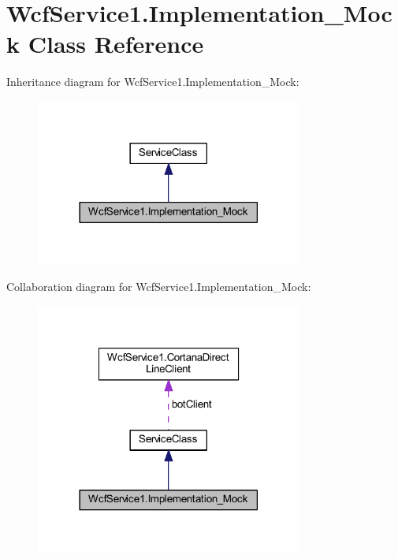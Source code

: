\hypertarget{class_wcf_service1_1_1_implementation___mock}{}\section{Wcf\+Service1.\+Implementation\+\_\+\+Mock Class Reference}
\label{class_wcf_service1_1_1_implementation___mock}


Inheritance diagram for Wcf\+Service1.\+Implementation\+\_\+\+Mock\+:\nopagebreak
\begin{figure}[H]
\begin{center}
\leavevmode
\includegraphics[width=249pt]{class_wcf_service1_1_1_implementation___mock__inherit__graph}
\end{center}
\end{figure}


Collaboration diagram for Wcf\+Service1.\+Implementation\+\_\+\+Mock\+:\nopagebreak
\begin{figure}[H]
\begin{center}
\leavevmode
\includegraphics[width=249pt]{class_wcf_service1_1_1_implementation___mock__coll__graph}
\end{center}
\end{figure}
